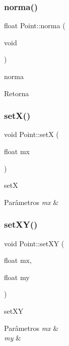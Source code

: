 \subsubsection{\texorpdfstring{norma()}{norma()}}
{\footnotesize\ttfamily float Point\+::norma (\begin{DoxyParamCaption}\item[{void}]{ }\end{DoxyParamCaption})}



norma 

\begin{DoxyReturn}{Retorna}

\end{DoxyReturn}
\mbox{\label{class_point_acee4acaa1d515e9973145f977e500fe6}} 
\subsubsection{\texorpdfstring{set\+X()}{setX()}}
{\footnotesize\ttfamily void Point\+::setX (\begin{DoxyParamCaption}\item[{float}]{mx }\end{DoxyParamCaption})}



setX 


\begin{DoxyParams}{Parâmetros}
{\em mx} & \\
\hline
\end{DoxyParams}
\mbox{\label{class_point_afe2b937778d9fe5c135ab61de91271e9}} 
\subsubsection{\texorpdfstring{set\+X\+Y()}{setXY()}}
{\footnotesize\ttfamily void Point\+::set\+XY (\begin{DoxyParamCaption}\item[{float}]{mx,  }\item[{float}]{my }\end{DoxyParamCaption})}



set\+XY 


\begin{DoxyParams}{Parâmetros}
{\em mx} & \\
\hline
{\em my} & \\
\hline
\end{DoxyParams}
\mbox{\label{class_point_a756b3f64d961a5059302f42e1fcf2332}} 
